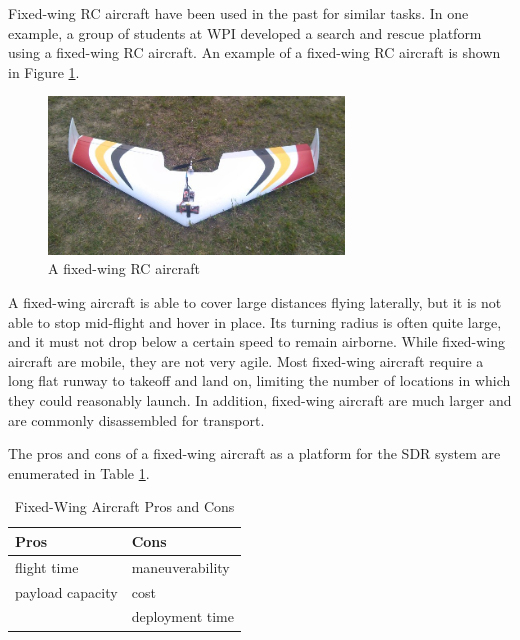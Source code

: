 Fixed-wing RC aircraft have been used in the past for similar tasks. In one example, a group of students at WPI developed a search and rescue platform using a fixed-wing RC aircraft\cite{airplane_iqp}. An example of a fixed-wing RC aircraft is shown in Figure \ref{fig:fixed_wing}.
\begin{figure}[ht]
\centering
\includegraphics[width=0.70\textwidth]{img/fixed-wing.jpg}
\caption{A fixed-wing RC aircraft}
\label{fig:fixed_wing}
\end{figure}\par
A fixed-wing aircraft is able to cover large distances flying laterally, but it is not able to stop mid-flight and hover in place\cite{airplane_book}. Its turning radius is often quite large, and it must not drop below a certain speed to remain airborne. While fixed-wing aircraft are mobile, they are not very agile. Most fixed-wing aircraft require a long flat runway to takeoff and land on, limiting the number of locations in which they could reasonably launch. In addition, fixed-wing aircraft are much larger and are commonly disassembled for transport.\par
The pros and cons of a fixed-wing aircraft as a platform for the SDR system are enumerated in Table \ref{table:wing_pc}.
\begin{table}[ht]
\centering
\caption{Fixed-Wing Aircraft Pros and Cons}
\label{table:wing_pc}
\begin{tabular}{l|l}
  Pros & Cons \\ \hline
  flight time & maneuverability \\
  payload capacity & cost \\
   & deployment time \\
\end{tabular}
\end{table}\par

